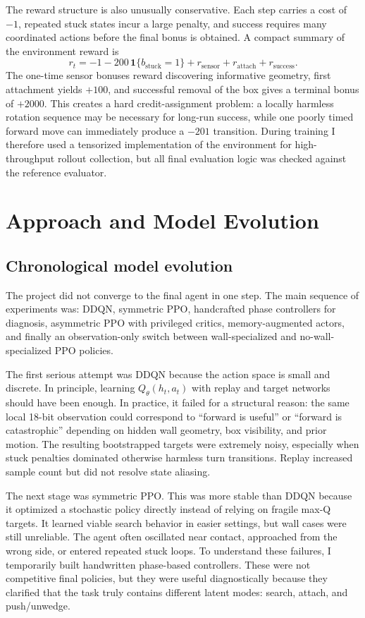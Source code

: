 \documentclass[11pt, oneside]{article}   	%
\begin{document}
The reward structure is also unusually conservative. Each step carries a cost of \(-1\), repeated stuck states incur a large penalty, and success requires many coordinated actions before the final bonus is obtained. A compact summary of the environment reward is
\[
r_t=-1-200\,\mathbf{1}\{b_{\mathrm{stuck}}=1\}+r_{\mathrm{sensor}}+r_{\mathrm{attach}}+r_{\mathrm{success}}.
\]
The one-time sensor bonuses reward discovering informative geometry, first attachment yields \(+100\), and successful removal of the box gives a terminal bonus of \(+2000\). This creates a hard credit-assignment problem: a locally harmless rotation sequence may be necessary for long-run success, while one poorly timed forward move can immediately produce a \(-201\) transition. During training I therefore used a tensorized implementation of the environment for high-throughput rollout collection, but all final evaluation logic was checked against the reference evaluator.

\section{Approach and Model Evolution}

\subsection{Chronological model evolution}

The project did not converge to the final agent in one step. The main sequence of experiments was: DDQN, symmetric PPO, handcrafted phase controllers for diagnosis, asymmetric PPO with privileged critics, memory-augmented actors, and finally an observation-only switch between wall-specialized and no-wall-specialized PPO policies.

The first serious attempt was DDQN because the action space is small and discrete. In principle, learning \(Q_\theta(h_t,a_t)\) with replay and target networks should have been enough. In practice, it failed for a structural reason: the same local 18-bit observation could correspond to ``forward is useful'' or ``forward is catastrophic'' depending on hidden wall geometry, box visibility, and prior motion. The resulting bootstrapped targets were extremely noisy, especially when stuck penalties dominated otherwise harmless turn transitions. Replay increased sample count but did not resolve state aliasing.

The next stage was symmetric PPO. This was more stable than DDQN because it optimized a stochastic policy directly instead of relying on fragile max-Q targets. It learned viable search behavior in easier settings, but wall cases were still unreliable. The agent often oscillated near contact, approached from the wrong side, or entered repeated stuck loops. To understand these failures, I temporarily built handwritten phase-based controllers. These were not competitive final policies, but they were useful diagnostically because they clarified that the task truly contains different latent modes: search, attach, and push/unwedge.
\end{document}
